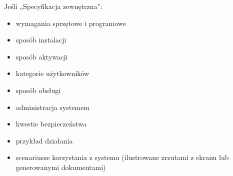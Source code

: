 \documentclass[a4paper,twoside,12pt]{book}
\begin{document}
Jeśli „Specyfikacja zewnętrzna”:
\begin{itemize}
\item  wymagania sprzętowe i programowe
\item  sposób instalacji
\item  sposób aktywacji
\item  kategorie użytkowników
\item  sposób obsługi
\item  administracja systemem
\item  kwestie bezpieczeństwa
\item  przykład działania
\item  scenariusze korzystania z systemu (ilustrowane zrzutami z ekranu lub generowanymi dokumentami)
\end{itemize}

%
%
%
%
%        
\end{document}
